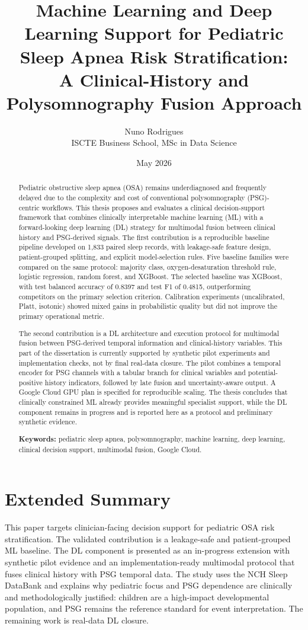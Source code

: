 \documentclass[10pt,a4paper,twocolumn]{article}
\title{Machine Learning and Deep Learning Support for Pediatric Sleep Apnea Risk Stratification: \\
A Clinical-History and Polysomnography Fusion Approach}
\author{Nuno Rodrigues \\
ISCTE Business School, MSc in Data Science}
\date{May 2026}
\begin{document}
\maketitle

\begin{abstract}
Pediatric obstructive sleep apnea (OSA) remains underdiagnosed and frequently delayed due to the complexity and cost of conventional polysomnography (PSG)-centric workflows. This thesis proposes and evaluates a clinical decision-support framework that combines clinically interpretable machine learning (ML) with a forward-looking deep learning (DL) strategy for multimodal fusion between clinical history and PSG-derived signals. The first contribution is a reproducible baseline pipeline developed on 1,833 paired sleep records, with leakage-safe feature design, patient-grouped splitting, and explicit model-selection rules. Five baseline families were compared on the same protocol: majority class, oxygen-desaturation threshold rule, logistic regression, random forest, and XGBoost. The selected baseline was XGBoost, with test balanced accuracy of 0.8397 and test F1 of 0.4815, outperforming competitors on the primary selection criterion. Calibration experiments (uncalibrated, Platt, isotonic) showed mixed gains in probabilistic quality but did not improve the primary operational metric.

The second contribution is a DL architecture and execution protocol for multimodal fusion between PSG-derived temporal information and clinical-history variables. This part of the dissertation is currently supported by synthetic pilot experiments and implementation checks, not by final real-data closure. The pilot combines a temporal encoder for PSG channels with a tabular branch for clinical variables and potential-positive history indicators, followed by late fusion and uncertainty-aware output. A Google Cloud GPU plan is specified for reproducible scaling. The thesis concludes that clinically constrained ML already provides meaningful specialist support, while the DL component remains in progress and is reported here as a protocol and preliminary synthetic evidence.

\textbf{Keywords:} pediatric sleep apnea, polysomnography, machine learning, deep learning, clinical decision support, multimodal fusion, Google Cloud.
\end{abstract}

\section*{Extended Summary}
This paper targets clinician-facing decision support for pediatric OSA risk stratification. The validated contribution is a leakage-safe and patient-grouped ML baseline. The DL component is presented as an in-progress extension with synthetic pilot evidence and an implementation-ready multimodal protocol that fuses clinical history with PSG temporal data. The study uses the NCH Sleep DataBank and explains why pediatric focus and PSG dependence are clinically and methodologically justified: children are a high-impact developmental population, and PSG remains the reference standard for event interpretation. The remaining work is real-data DL closure.
\end{document}
